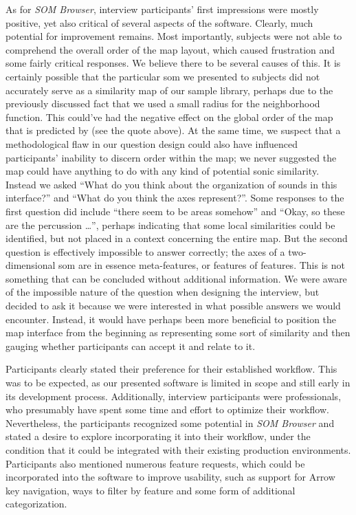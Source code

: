 As for \textit{SOM Browser}, interview participants' first impressions were
mostly positive, yet also critical of several aspects of the software. Clearly,
much potential for improvement remains. Most importantly, subjects were not able
to comprehend the overall order of the map layout, which caused frustration and
some fairly critical responses. We believe there to be several causes of this.
It is certainly possible that the particular \gls{som} we presented to subjects
did not accurately serve as a similarity map of our sample library, perhaps due
to the previously discussed fact that we used a small radius for the
neighborhood function. This could've had the negative effect on the global order
of the map that is predicted by \citet{kohonen1990} (see the quote above). At
the same time, we suspect that a methodological flaw in our question design
could also have influenced participants' inability to discern order within the
map; we never suggested the map could have anything to do with any kind of
potential sonic similarity. Instead we asked ``What do you think about the
organization of sounds in this interface?'' and ``What do you think the axes
represent?''. Some responses to the first question did include ``there seem to
be areas somehow'' and ``Okay, so these are the percussion \dots'', perhaps
indicating that some local similarities could be identified, but not placed in a
context concerning the entire map. But the second question is effectively
impossible to answer correctly; the axes of a two-dimensional \gls{som} are in
essence meta-features, or features of features. This is not something that can
be concluded without additional information. We were aware of the impossible
nature of the question when designing the interview, but decided to ask it
because we were interested in what possible answers we would encounter. Instead,
it would have perhaps been more beneficial to position the map interface from
the beginning as representing some sort of similarity and then gauging whether
participants can accept it and relate to it.

\smallskip

Participants clearly stated their preference for their established workflow.
This was to be expected, as our presented software is limited in scope and still
early in its development process. Additionally, interview participants were
professionals, who presumably have spent some time and effort to optimize their
workflow. Nevertheless, the participants recognized some potential in
\textit{SOM Browser} and stated a desire to explore incorporating it into their
workflow, under the condition that it could be integrated with their existing
production environments. Participants also mentioned numerous feature requests,
which could be incorporated into the software to improve usability, such as
support for Arrow key navigation, ways to filter by feature and some form of
additional categorization.

